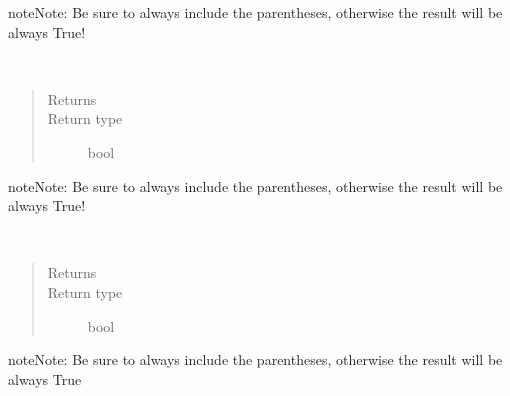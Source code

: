 \documentclass[letterpaper,10pt,english]{sphinxmanual}
\begin{document}
\begin{fulllineitems}
\begin{fulllineitems}
\begin{quote}
\begin{description}
\end{description}\end{quote}

\begin{sphinxadmonition}{note}{Note:}
Be sure to always include the parentheses, otherwise the result will be always True!
\end{sphinxadmonition}

\end{fulllineitems}


\begin{fulllineitems}
\label{\detokenize{Reference:salabim.Component.isdata}}~\begin{quote}\begin{description}
\item[{Returns}] \leavevmode
{}

\item[{Return type}] \leavevmode
bool

\end{description}\end{quote}

\begin{sphinxadmonition}{note}{Note:}
Be sure to always include the parentheses, otherwise the result will be always True!
\end{sphinxadmonition}

\end{fulllineitems}


\begin{fulllineitems}
\label{\detokenize{Reference:salabim.Component.isinterrupted}}~\begin{quote}\begin{description}
\item[{Returns}] \leavevmode
{}

\item[{Return type}] \leavevmode
bool

\end{description}\end{quote}

\begin{sphinxadmonition}{note}{Note:}
Be sure to always include the parentheses, otherwise the result will be always True
\end{sphinxadmonition}


\end{fulllineitems}
\end{fulllineitems}
\end{document}
